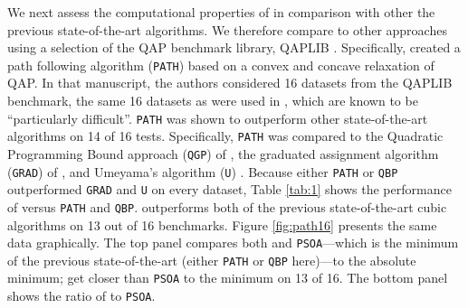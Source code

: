 \documentclass[10pt,journal,cspaper,compsoc]{IEEEtran}
\begin{document}
We next assess the computational properties of \FAQ in comparison with other the previous state-of-the-art algorithms.  We therefore compare \FAQ to other approaches using a selection of the QAP benchmark library, QAPLIB \cite{Burkard1997}.  Specifically, \cite{Zaslavskiy2009} created a path following algorithm (\texttt{PATH}) based on a convex and concave relaxation of QAP.  In that manuscript, the authors considered 16 datasets from the QAPLIB benchmark, the same 16 datasets as were used in \cite{Schellewald2001}, which are known to be ``particularly difficult''.  \texttt{PATH} was shown to outperform other state-of-the-art algorithms on 14 of 16 tests.  Specifically, \texttt{PATH} was compared to the Quadratic Programming Bound approach (\texttt{QGP}) of \cite{Anstreicher2001}, the graduated assignment algorithm (\texttt{GRAD}) of \cite{Gold1996}, and Umeyama's algorithm (\texttt{U}) \cite{Umeyama1988}.  Because either \texttt{PATH} or \texttt{QBP} outperformed \texttt{GRAD} and \texttt{U} on every dataset, Table \ref{tab:1} shows the performance of \FAQ versus \texttt{PATH} and \texttt{QBP}.  \FAQ outperforms both of the previous state-of-the-art cubic algorithms on 13 out of 16 benchmarks.  Figure \ref{fig:path16} presents the same data graphically. The top panel compares both \FAQ and \texttt{PSOA}---which is the minimum of the previous state-of-the-art (either \texttt{PATH} or \texttt{QBP} here)---to the absolute minimum; \FAQ get closer than \texttt{PSOA} to the minimum on 13 of 16. The bottom panel shows the ratio of \FAQ to \texttt{PSOA}. 
\end{document}
